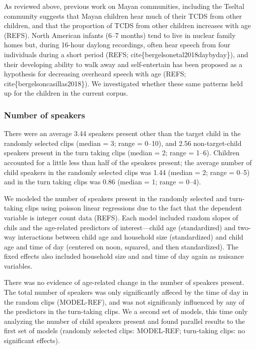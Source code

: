 \documentclass[floatsintext,man]{apa6}
\theoremstyle{definition}
\theoremstyle{definition}
\theoremstyle{definition}
\theoremstyle{remark}
\begin{document}
As reviewed above, previous work on Mayan communities, including the
Tseltal community suggests that Mayan children hear much of their TCDS
from other children, and that the proportion of TCDS from other children
increases with age (REFS). North American infants (6--7 months) tend to
live in nuclear family homes but, during 16-hour daylong recordings,
often hear speech from four individuals during a short period (REFS;
cite\{bergelsonetal2018daybyday\}), and their developing ability to walk
away and self-entertain has been proposed as a hypothesis for decreasing
overheard speech with age (REFS; cite\{bergelsoncasillas2018\}). We
investigated whether these same patterns held up for the children in the
current corpus.

\subsubsection{Number of speakers}\label{number-of-speakers}

There were an average 3.44 speakers present other than the target child
in the randomly selected clips (median = 3; range = 0--10), and 2.56
non-target-child speakers present in the turn taking clips (median = 2;
range = 1--6). Children accounted for a little less than half of the
speakers present; the average number of child speakers in the randomly
selected clips was 1.44 (median = 2; range = 0--5) and in the turn
taking clips was 0.86 (median = 1; range = 0--4).

We modeled the number of speakers present in the randomly selected and
turn-taking clips using poisson linear regressions due to the fact that
the dependent variable is integer count data (REFS). Each model included
random slopes of chils and the age-related predictors of
interest---child age (standardized) and two-way interactions between
child age and household size (standardized) and child age and time of
day (centered on noon, squared, and then standardized). The fixed
effects also included household size and and time of day again as
nuisance variables.

There was no evidence of age-related change in the number of speakers
present. The total number of speakers was only significantly affeced by
the time of day in the random clips (MODEL-REF), and was not
significanly influenced by any of the predictors in the turn-taking
clips. We a second set of models, this time only analyzing the number of
child speakers present and found parallel results to the first set of
models (randomly selected clips: MODEL-REF; turn-taking clips: no
significant effects).
\end{document}
